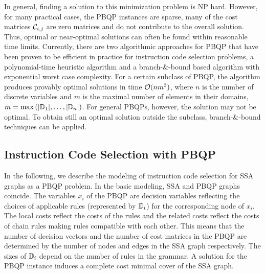 In general, finding a solution to this minimization problem is NP
hard.  However, for many practical cases, the PBQP instances are
sparse, \ie many of the cost matrices ${\mathcal C}_{i,j}$ are zero
matrices and do not contribute to the overall solution. Thus, optimal
or near-optimal solutions can often be found within reasonable time
limits.  Currently, there are two algorithmic approaches for PBQP that
have been proven to be efficient in practice for instruction code selection
problems, \ie a polynomial-time heuristic algorithm and a
branch-\&-bound based algorithm with exponential worst case
complexity.  For a certain subclass of PBQP, the algorithm produces
provably optimal solutions in time ${\cal O}(n m^3)$, where $n$ is the
number of discrete variables and $m$ is the maximal number of elements
in their domains, \ie $m=\max
\left(|\mathbb D_1|,\ldots,|\mathbb D_n\right|)$. For general
{PBQP}s, however, the solution may not be optimal. To obtain still an
optimal solution outside the subclass, branch-\&-bound techniques can
be applied.

\subsection{Instruction Code Selection with PBQP}
In the following, we describe the modeling of instruction code selection for SSA
graphs as a PBQP problem.  In the basic modeling, SSA and PBQP graphs
coincide.  The variables $x_i$ of the PBQP are decision variables
reflecting the choices of applicable rules (represented by
$\mathbb D_i$) for the corresponding node of $x_i$. The local costs
reflect the costs of the rules and the related costs reflect the costs
of chain rules making rules compatible with each other.  This means
that the number of decision vectors and the number of cost matrices in
the PBQP are determined by the number of nodes and edges in the SSA
graph respectively.  The sizes of $\mathbb D_i$ depend on the number
of rules in the grammar. A solution for the PBQP instance induces a
complete cost minimal cover of the SSA graph.

